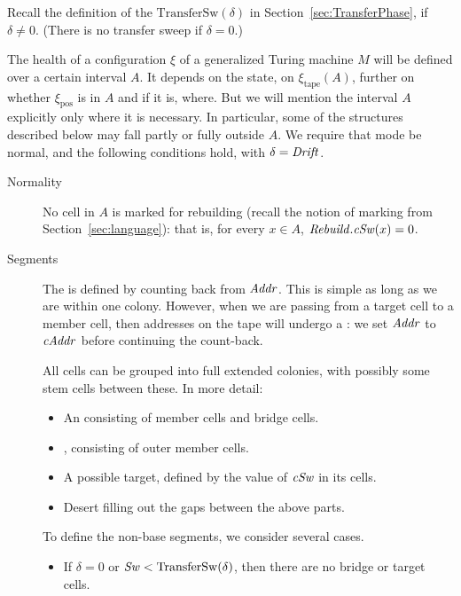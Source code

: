 \documentclass[12pt]{memoir}
\newcommand{\fld}[1]{\ensuremath{\textit{#1\/}}}
\newcommand{\pos}{\mathrm{pos}}
\newcommand{\Addr}{\fld{Addr}}
\newcommand{\cAddr}{\fld{cAddr}}
\newcommand{\Drift}{\fld{Drift}}
\newcommand{\Rebuild}{\fld{Rebuild}}
\newcommand{\Sweep}{\fld{Sw}}
\newcommand{\cSweep}{\fld{cSw}}
\newcommand{\tape}{\mathrm{tape}}
\newcommand{\TransferSw}{\mathrm{TransferSw}}
\begin{document}
Recall the definition of the 
\( \TransferSw(\delta) \) in Section~\ref{sec:TransferPhase}, if \( \delta \ne 0 \).
(There is no transfer sweep if \( \delta = 0 \).)

\begin{definition}\label{def:healthy}
The health of a configuration \( \xi \) of a generalized Turing machine 
\( M \) will be defined over a certain interval \( A \).
It depends on the state, 
on \( \xi_{\tape}(A) \), further on whether \( \xi_{\pos} \) is in \( A \) and
if it is, where.
But we will mention the interval \( A \) explicitly only where it is necessary.
In particular, some of the structures described below may fall partly or fully
outside \( A \).
We require that mode be normal, and the following conditions hold, with \( \delta=\Drift \).

\begin{description}

\item[Normality]
  No cell in \( A \) is marked for rebuilding (recall the notion of marking from
Section~\ref{sec:language}):
that is, for every \( x \in A \), \( \Rebuild.\cSweep(x) = 0 \).

\item[Segments]
  The  is defined by counting back from \( \Addr \).
This is simple as long as we are within one colony.
However, when we are passing from a target cell to a member cell, then addresses on
the tape will undergo a : we set \( \Addr \) to \( \cAddr \) before
continuing the count-back.

  All cells can be grouped into full extended colonies,
  with possibly some stem cells between these.
  In more detail:
  \begin{itemize}
  \item An  consisting of member cells and bridge cells.
  \item {}, consisting of outer member cells.
  \item A possible target, defined by the value of \( \cSweep \) in its cells.
  \item Desert filling out the gaps between the above parts.
  \end{itemize}

  To define the non-base segments, we consider several cases.
  \begin{itemize}
  \item 
    If \( \delta=0 \) or \( \Sweep < \TransferSw(\delta) \), 
    then there are no bridge or target cells.


\end{itemize}
\end{description}
\end{definition}
\end{document}

